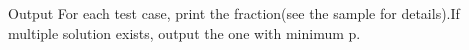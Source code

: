 Output
For each test case, print the fraction(see the sample for details).If multiple solution exists, output the one with minimum p.